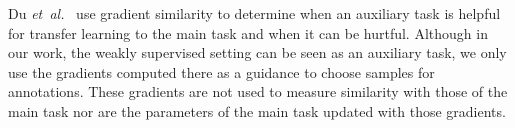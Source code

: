 \documentclass[letterpaper, 10 pt, conference]{ieeeconf}  %
\newcommand\etal{\emph{et~al.}}
\begin{document}
Du \etal~\cite{du2018adapting} use gradient similarity to determine when an auxiliary task is helpful for transfer learning to the main task and when it can be hurtful. Although in our work, the weakly supervised setting can be seen as an auxiliary task, we only use the gradients computed there as a guidance to choose samples for annotations. These gradients are not used to measure similarity with those of the main task nor are the parameters of the main task updated with those gradients. 


%
%
%
\end{document}
